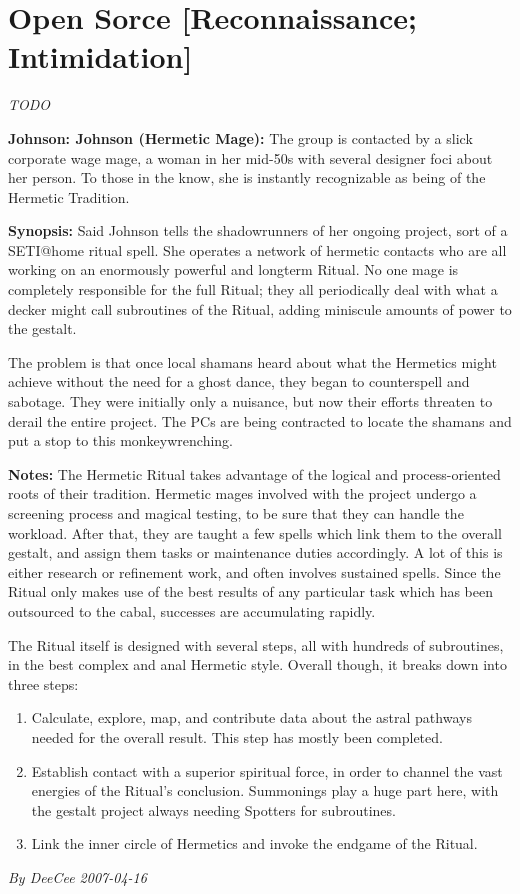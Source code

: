 \documentclass[letterpaper,twocolumn,10.5pt]{article}
\newenvironment{scenario}[6]
	{
		\section{#1 {\small[#2]}}
		\textit{#3}
		\def\TMPSCENARIO{#4 #5}
	}
	{\small\textit{By \TMPSCENARIO}}
\newcommand{\johnson}[2]{\textbf{Johnson: #1 (#2):}}
\newcommand{\synopsis}{\textbf{Synopsis: }}
\newcommand{\notes}{\textbf{Notes: }}
\begin{document}
\begin{scenario}{Open Sorce}
	{Reconnaissance; Intimidation}
	{TODO}
	{DeeCee}
	{2007-04-16}
	{https://forum.rpg.net/showthread.php?321504-Shadowrun-4th-101-Instant-Scenarios\&p=7175542#post7175542}

\johnson{Johnson}{Hermetic Mage} 
The group is contacted by a slick corporate wage mage, a woman in her mid-50s with several designer foci about her person. To those in the know, she is instantly recognizable as being of the Hermetic Tradition.

\synopsis Said Johnson tells the shadowrunners of her ongoing project, sort of a SETI@home ritual spell. She operates a network of hermetic contacts who are all working on an enormously powerful and longterm Ritual. No one mage is completely responsible for the full Ritual; they all periodically deal with what a decker might call subroutines of the Ritual, adding miniscule amounts of power to the gestalt.

The problem is that once local shamans heard about what the Hermetics might achieve without the need for a ghost dance, they began to counterspell and sabotage. They were initially only a nuisance, but now their efforts threaten to derail the entire project. The PCs are being contracted to locate the shamans and put a stop to this monkeywrenching.

\notes The Hermetic Ritual takes advantage of the logical and process-oriented roots of their tradition. Hermetic mages involved with the project undergo a screening process and magical testing, to be sure that they can handle the workload. After that, they are taught a few spells which link them to the overall gestalt, and assign them tasks or maintenance duties accordingly. A lot of this is either research or refinement work, and often involves sustained spells. Since the Ritual only makes use of the best results of any particular task which has been outsourced to the cabal, successes are accumulating rapidly.

The Ritual itself is designed with several steps, all with hundreds of subroutines, in the best complex and anal Hermetic style. Overall though, it breaks down into three steps:

\begin{enumerate}
\item Calculate, explore, map, and contribute data about the astral pathways needed for the overall result. This step has mostly been completed.
\item Establish contact with a superior spiritual force, in order to channel the vast energies of the Ritual's conclusion. Summonings play a huge part here, with the gestalt project always needing Spotters for subroutines.
\item Link the inner circle of Hermetics and invoke the endgame of the Ritual.
\end{enumerate}


\end{scenario}
\end{document}
